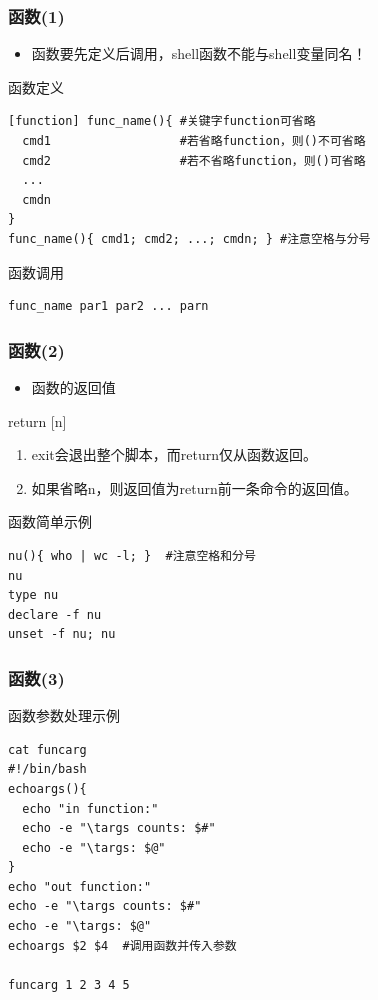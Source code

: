 \documentclass[xcolor=svgnames,presentation]{beamer}
\begin{document}
\begin{frame}[fragile]
\frametitle{函数(1)}
\label{sec-1-2-51}
\begin{itemize}

\item 函数要先定义后调用，shell函数不能与shell变量同名！
\label{sec-1-2-51-1}%
\end{itemize} %
\begin{exampleblock}{函数定义}
\label{sec-1-2-51-2}


\begin{verbatim}
[function] func_name(){ #关键字function可省略
  cmd1                  #若省略function，则()不可省略
  cmd2                  #若不省略function，则()可省略
  ...
  cmdn
}
func_name(){ cmd1; cmd2; ...; cmdn; } #注意空格与分号
\end{verbatim}
\end{exampleblock}
\begin{block}{函数调用}
\label{sec-1-2-51-3}


\begin{verbatim}
func_name par1 par2 ... parn
\end{verbatim}
\end{block}
\end{frame}
\begin{frame}[fragile]
\frametitle{函数(2)}
\label{sec-1-2-52}
\begin{itemize}

\item 函数的返回值
\label{sec-1-2-52-1}%
\end{itemize} %
\begin{exampleblock}{return [n]}
\label{sec-1-2-52-2}

\begin{enumerate}
\item exit会退出整个脚本，而return仅从函数返回。
\item 如果省略n，则返回值为return前一条命令的返回值。
\end{enumerate}
\end{exampleblock}
\begin{block}{函数简单示例}
\label{sec-1-2-52-3}


\begin{verbatim}
nu(){ who | wc -l; }  #注意空格和分号
nu
type nu
declare -f nu
unset -f nu; nu
\end{verbatim}
\end{block}
\end{frame}
\begin{frame}[fragile]
\frametitle{函数(3)}
\label{sec-1-2-53}
\begin{exampleblock}{函数参数处理示例}
\label{sec-1-2-53-1}


\begin{verbatim}
cat funcarg
#!/bin/bash
echoargs(){
  echo "in function:"
  echo -e "\targs counts: $#"
  echo -e "\targs: $@"
}
echo "out function:"
echo -e "\targs counts: $#"
echo -e "\targs: $@"
echoargs $2 $4  #调用函数并传入参数

funcarg 1 2 3 4 5
\end{verbatim}
\end{exampleblock}
\end{frame}
\end{document}
